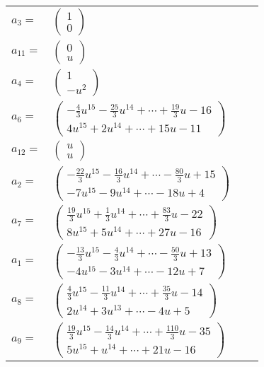 \documentclass[1p]{elsarticle_modified}
\theoremstyle{definition}
\begin{document}
\begin{tabular}{m{7pt} m{180pt} m{7pt} m{180pt} }
\flushright $a_{3}=$&$\begin{pmatrix}1\\0\end{pmatrix}$ \\
\flushright $a_{11}=$&$\begin{pmatrix}0\\u\end{pmatrix}$ \\
\flushright $a_{4}=$&$\begin{pmatrix}1\\- u^2\end{pmatrix}$ \\
\flushright $a_{6}=$&$\begin{pmatrix}-\frac{4}{3} u^{15}-\frac{25}{3} u^{14}+\cdots+\frac{19}{3} u-16\\4 u^{15}+2 u^{14}+\cdots+15 u-11\end{pmatrix}$ \\
\flushright $a_{12}=$&$\begin{pmatrix}u\\u\end{pmatrix}$ \\
\flushright $a_{2}=$&$\begin{pmatrix}-\frac{22}{3} u^{15}-\frac{16}{3} u^{14}+\cdots-\frac{80}{3} u+15\\-7 u^{15}-9 u^{14}+\cdots-18 u+4\end{pmatrix}$ \\
\flushright $a_{7}=$&$\begin{pmatrix}\frac{19}{3} u^{15}+\frac{1}{3} u^{14}+\cdots+\frac{83}{3} u-22\\8 u^{15}+5 u^{14}+\cdots+27 u-16\end{pmatrix}$ \\
\flushright $a_{1}=$&$\begin{pmatrix}-\frac{13}{3} u^{15}-\frac{4}{3} u^{14}+\cdots-\frac{50}{3} u+13\\-4 u^{15}-3 u^{14}+\cdots-12 u+7\end{pmatrix}$ \\
\flushright $a_{8}=$&$\begin{pmatrix}\frac{4}{3} u^{15}-\frac{11}{3} u^{14}+\cdots+\frac{35}{3} u-14\\2 u^{14}+3 u^{13}+\cdots-4 u+5\end{pmatrix}$ \\
\flushright $a_{9}=$&$\begin{pmatrix}\frac{19}{3} u^{15}-\frac{14}{3} u^{14}+\cdots+\frac{110}{3} u-35\\5 u^{15}+u^{14}+\cdots+21 u-16\end{pmatrix}$ \\

\end{tabular}
\end{document}
